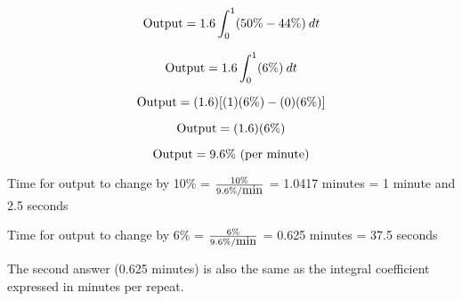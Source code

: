 $$\hbox{Output} = 1.6 \int_0^1 (50\% - 44\%) \> dt$$

$$\hbox{Output} = 1.6 \int_0^1 (6\%) \> dt$$

$$\hbox{Output} = (1.6) [(1)(6\%) - (0)(6\%)]$$

$$\hbox{Output} = (1.6) (6\%)$$

$$\hbox{Output} = 9.6\% \hbox{ (per minute)}$$

\vskip 10pt

Time for output to change by 10\% = $10\% \over 9.6\%/\hbox{min}$ = 1.0417 minutes = 1 minute and 2.5 seconds

\vskip 10pt

Time for output to change by 6\% = $6\% \over 9.6\%/\hbox{min}$ = 0.625 minutes = 37.5 seconds

\vskip 10pt

The second answer (0.625 minutes) is also the same as the integral coefficient expressed in minutes per repeat.




